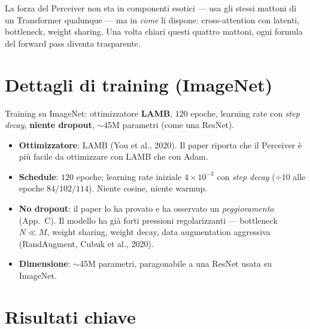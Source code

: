\documentclass[11pt]{article}
\newcommand{\curstage}{0}
\newcommand{\stage}[1]{\gdef\curstage{#1}}
\begin{document}
\begin{ideabox}[title={\textbf{Idea chiave}}]
La forza del Perceiver non sta in componenti esotici --- usa gli stessi mattoni di un Transformer qualunque --- ma in \emph{come} li dispone: cross-attention con latenti, bottleneck, weight sharing. Una volta chiari questi quattro mattoni, ogni formula del forward pass diventa trasparente.
\end{ideabox}

\section{Dettagli di training (ImageNet)}
\stage{0}

\begin{brevebox}[title={\textbf{In breve}}]
Training su ImageNet: ottimizzatore \textbf{LAMB}, $120$ epoche, learning rate con \emph{step decay}, \textbf{niente dropout}, $\sim$45M parametri (come una ResNet).
\end{brevebox}

\begin{notabox}
\begin{itemize}
\item \textbf{Ottimizzatore}: LAMB (You et al., 2020). Il paper riporta che il Perceiver è più facile da ottimizzare con LAMB che con Adam.
\item \textbf{Schedule}: $120$ epoche; learning rate iniziale $4\times10^{-3}$ con \emph{step decay} ($\div10$ alle epoche $84/102/114$). Niente cosine, niente warmup.
\item \textbf{No dropout}: il paper lo ha provato e ha osservato un \emph{peggioramento} (App.~C). Il modello ha già forti pressioni regolarizzanti --- bottleneck $N \ll M$, weight sharing, weight decay, data augmentation aggressiva (RandAugment, Cubuk et al., 2020).
\item \textbf{Dimensione}: $\sim$45M parametri, paragonabile a una ResNet usata su ImageNet.
\end{itemize}
\end{notabox}

\section{Risultati chiave}
\label{sec:risultati}
\stage{0}
\end{document}
